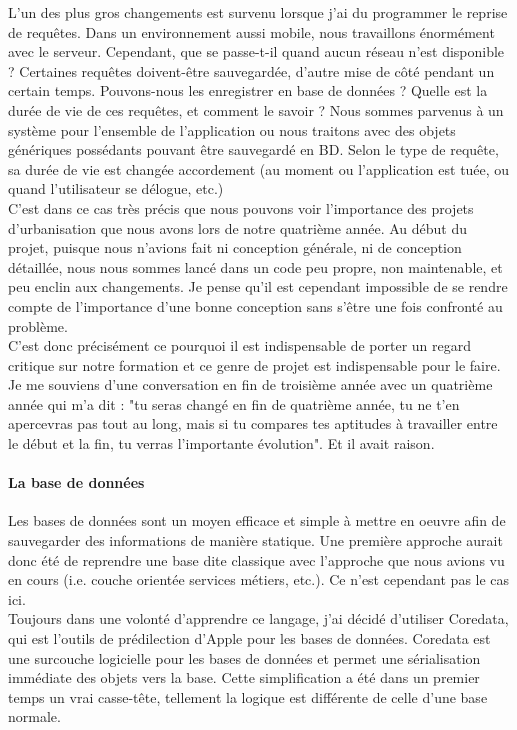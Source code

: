 \documentclass{article}
\begin{document}
		L'un des plus gros changements est survenu lorsque j'ai du programmer le reprise de requêtes. Dans un environnement aussi mobile, nous travaillons énormément avec le serveur. Cependant, que se passe-t-il quand aucun réseau n'est disponible ? Certaines requêtes doivent-être sauvegardée, d'autre mise de côté pendant un certain temps. Pouvons-nous les enregistrer en base de données ? Quelle est la durée de vie de ces requêtes, et comment le savoir ? Nous sommes parvenus à un système pour l'ensemble de l'application ou nous traitons avec des objets génériques possédants pouvant être sauvegardé en BD. Selon le type de requête, sa durée de vie est changée accordement (au moment ou l'application est tuée, ou quand l'utilisateur se délogue, etc.)  	\\
		
		C'est dans ce cas très précis que nous pouvons voir l'importance des projets d'urbanisation que nous avons lors de notre quatrième année. Au début du projet, puisque nous n'avions fait ni conception générale, ni de conception détaillée, nous nous sommes lancé dans un code peu propre, non maintenable, et peu enclin aux changements. Je pense qu'il est cependant impossible de se rendre compte de l'importance d'une bonne conception sans s'être une fois confronté au problème. \\
		
		C'est donc précisément ce pourquoi il est indispensable de porter un regard critique sur notre formation et ce genre de projet est indispensable pour le faire. Je me souviens d'une conversation en fin de troisième année avec un quatrième année qui m'a dit : "tu seras changé en fin de quatrième année, tu ne t'en apercevras pas tout au long, mais si tu compares tes aptitudes à travailler entre le début et la fin, tu verras l'importante évolution". Et il avait raison.\\
				
		\paragraph{La base de données}
		Les bases de données sont un moyen efficace et simple à mettre en oeuvre afin de sauvegarder des informations de manière statique. Une première approche aurait donc été de reprendre une base dite classique avec l'approche que nous avions vu en cours (i.e. couche orientée services métiers, etc.). Ce n'est cependant pas le cas ici.\\
			
		Toujours dans une volonté d'apprendre ce langage, j'ai décidé d'utiliser Coredata, qui est l'outils de prédilection d'Apple pour les bases de données. Coredata est une surcouche logicielle pour les bases de données et permet une sérialisation immédiate des objets vers la base. Cette simplification a été dans un premier temps un vrai casse-tête, tellement la logique est différente de celle d'une base normale. \\
		
\end{document}
